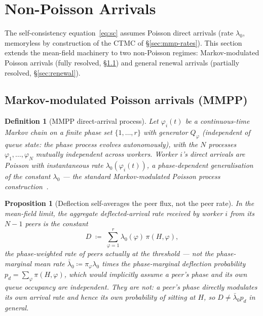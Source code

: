 \documentclass[11pt,a4paper]{report}
\newtheorem{proposition}[theorem]{Proposition}
\newtheorem{definition}{Definition}[section]
\begin{document}
\section{Non-Poisson Arrivals}
\label{sec:non-poisson}

The self-consistency equation~\eqref{eq:sc} assumes Poisson direct
arrivals (rate $\lambda_0$, memoryless by construction of the CTMC of
\S\ref{sec:mmp-rates}). This section extends the mean-field machinery
to two non-Poisson regimes: Markov-modulated Poisson arrivals
(fully resolved, \S\ref{sec:mmpp}) and general renewal arrivals
(partially resolved, \S\ref{sec:renewal}).

\subsection{Markov-modulated Poisson arrivals (MMPP)}
\label{sec:mmpp}

\begin{definition}[MMPP direct-arrival process]
\label{def:mmpp}
Let $\varphi_i(t)$ be a continuous-time Markov chain on a finite phase
set $\{1,\ldots,r\}$ with generator $Q_\varphi$ (independent of queue
state: the phase process evolves autonomously), with the $N$ processes
$\varphi_1,\ldots,\varphi_N$ mutually independent across workers.
Worker $i$'s direct arrivals are Poisson with instantaneous rate
$\lambda_0(\varphi_i(t))$, a phase-dependent generalisation of the
constant $\lambda_0$ --- the standard Markov-modulated Poisson process
construction~\cite{fischer1993}.
\end{definition}

\begin{proposition}[Deflection self-averages the peer flux, not the peer rate]
\label{prop:deflect-averages}
In the mean-field limit, the aggregate deflected-arrival rate received
by worker $i$ from its $N-1$ peers is the constant
\begin{equation}
  D \;\coloneqq\; \sum_{\varphi=1}^r \lambda_0(\varphi)\,\pi(H,\varphi),
  \label{eq:mmpp-flux}
\end{equation}
the phase-weighted rate of peers actually \emph{at} the threshold ---
\emph{not} the phase-marginal mean rate $\bar\lambda_0 \coloneqq
\pi_\varphi\lambda_0$ times the phase-marginal deflection probability
$p_d = \sum_\varphi \pi(H,\varphi)$, which would implicitly assume a
peer's phase and its own queue occupancy are independent. They are
not: a peer's phase directly modulates its own arrival rate and hence
its own probability of sitting at $H$, so $D \neq \bar\lambda_0 p_d$
in general.
\end{proposition}
\end{document}
